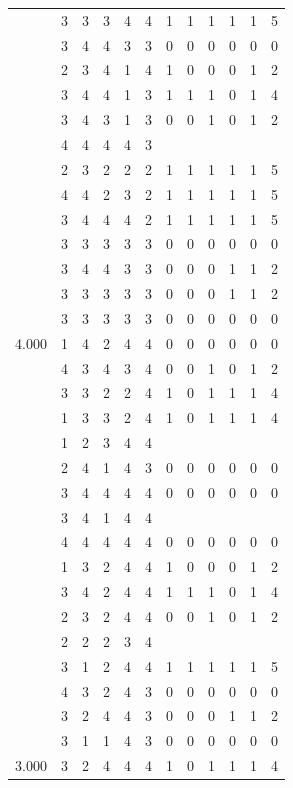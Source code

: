 \documentclass[]{book}
\theoremstyle{definition}
\theoremstyle{definition}
\theoremstyle{definition}
\theoremstyle{remark}
\begin{document}
\begin{table}
{\begin{tabular}[t]{rrrrrrrrrrrr}
 & 3 & 3 & 3 & 4 & 4 & 1 & 1 & 1 & 1 & 1 & 5\\
 & 3 & 4 & 4 & 3 & 3 & 0 & 0 & 0 & 0 & 0 & 0\\
 & 2 & 3 & 4 & 1 & 4 & 1 & 0 & 0 & 0 & 1 & 2\\
 & 3 & 4 & 4 & 1 & 3 & 1 & 1 & 1 & 0 & 1 & 4\\
 & 3 & 4 & 3 & 1 & 3 & 0 & 0 & 1 & 0 & 1 & 2\\
 & 4 & 4 & 4 & 4 & 3 &  &  &  &  &  & \\
 & 2 & 3 & 2 & 2 & 2 & 1 & 1 & 1 & 1 & 1 & 5\\
 & 4 & 4 & 2 & 3 & 2 & 1 & 1 & 1 & 1 & 1 & 5\\
 & 3 & 4 & 4 & 4 & 2 & 1 & 1 & 1 & 1 & 1 & 5\\
 & 3 & 3 & 3 & 3 & 3 & 0 & 0 & 0 & 0 & 0 & 0\\
 & 3 & 4 & 4 & 3 & 3 & 0 & 0 & 0 & 1 & 1 & 2\\
 & 3 & 3 & 3 & 3 & 3 & 0 & 0 & 0 & 1 & 1 & 2\\
 & 3 & 3 & 3 & 3 & 3 & 0 & 0 & 0 & 0 & 0 & 0\\
4.000 & 1 & 4 & 2 & 4 & 4 & 0 & 0 & 0 & 0 & 0 & 0\\
 & 4 & 3 & 4 & 3 & 4 & 0 & 0 & 1 & 0 & 1 & 2\\
 & 3 & 3 & 2 & 2 & 4 & 1 & 0 & 1 & 1 & 1 & 4\\
 & 1 & 3 & 3 & 2 & 4 & 1 & 0 & 1 & 1 & 1 & 4\\
 & 1 & 2 & 3 & 4 & 4 &  &  &  &  &  & \\
 & 2 & 4 & 1 & 4 & 3 & 0 & 0 & 0 & 0 & 0 & 0\\
 & 3 & 4 & 4 & 4 & 4 & 0 & 0 & 0 & 0 & 0 & 0\\
 & 3 & 4 & 1 & 4 & 4 &  &  &  &  &  & \\
 & 4 & 4 & 4 & 4 & 4 & 0 & 0 & 0 & 0 & 0 & 0\\
 & 1 & 3 & 2 & 4 & 4 & 1 & 0 & 0 & 0 & 1 & 2\\
 & 3 & 4 & 2 & 4 & 4 & 1 & 1 & 1 & 0 & 1 & 4\\
 & 2 & 3 & 2 & 4 & 4 & 0 & 0 & 1 & 0 & 1 & 2\\
 & 2 & 2 & 2 & 3 & 4 &  &  &  &  &  & \\
 & 3 & 1 & 2 & 4 & 4 & 1 & 1 & 1 & 1 & 1 & 5\\
 & 4 & 3 & 2 & 4 & 3 & 0 & 0 & 0 & 0 & 0 & 0\\
 & 3 & 2 & 4 & 4 & 3 & 0 & 0 & 0 & 1 & 1 & 2\\
 & 3 & 1 & 1 & 4 & 3 & 0 & 0 & 0 & 0 & 0 & 0\\
3.000 & 3 & 2 & 4 & 4 & 4 & 1 & 0 & 1 & 1 & 1 & 4\\

\end{tabular}}
\end{table}
\end{document}
